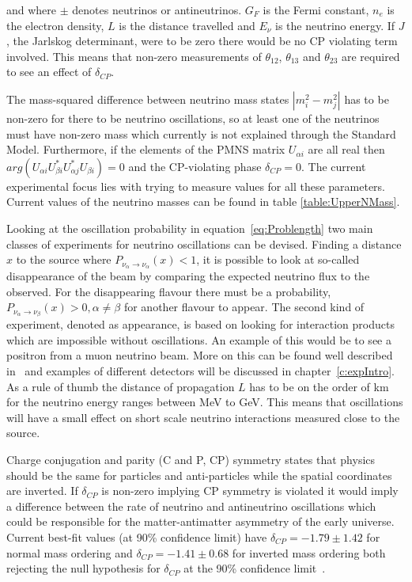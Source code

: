 and where $\pm$ denotes neutrinos or antineutrinos. $G_F$ is the Fermi constant, $n_e$ is the electron density, $L$ is the distance travelled and $E_\nu$ is the neutrino energy. If $J$, the Jarlskog determinant, were to be zero there would be no CP violating term involved. This means that non-zero measurements of $\theta_{12}$, $\theta_{13}$ and $\theta_{23}$ are required to see an effect of $\delta_{CP}$. 

The mass-squared difference between neutrino mass states $\left|m_i^2 - m_j^2\right|$ has to be non-zero for there to be neutrino oscillations, so at least one of the neutrinos must have non-zero mass which currently is not explained through the Standard Model. Furthermore, if the elements of the PMNS matrix $U_{\alpha i}$ are all real then $arg(U_{\alpha i} U^*_{\beta i} U^*_{\alpha j}  U_{\beta i} ) = 0$ and the CP-violating phase $\delta_{CP} =0$. The current experimental focus lies with trying to measure values for all these parameters. Current values of the neutrino masses can be found in table \ref{table:UpperNMass}.

Looking at the oscillation probability in equation~\eqref{eq:Problength} two main classes of experiments for neutrino oscillations can be devised. Finding a distance $x$ to the source where $P_{\nu_\alpha \rightarrow \nu_\alpha} (x) < 1$, it is possible to look at so-called disappearance of the beam by comparing the expected neutrino flux to the observed. For the disappearing flavour there must be a probability, $P_{\nu_\alpha \rightarrow \nu_\beta} (x) > 0, \alpha \neq \beta$ for another flavour to appear. The second kind of experiment, denoted as appearance, is based on looking for interaction products which are impossible without oscillations.  An example of this would be to see a positron from a muon neutrino beam. More on this can be found well described in~\cite{34doi:10.1142/9789812562203_0002} and examples of different detectors will be discussed in chapter~\ref{c:expIntro}. As a rule of thumb the distance of propagation $L$ has to be on the order of km for the neutrino energy ranges between MeV to GeV. This means that oscillations will have a small effect on short scale neutrino interactions measured close to the source.

Charge conjugation and parity (C and P, CP) symmetry states that physics should be the same for particles and anti-particles while the spatial coordinates are inverted. If $\delta_{CP}$ is non-zero implying CP symmetry is violated it would imply a difference between the rate of neutrino and antineutrino oscillations which could be responsible for the matter-antimatter asymmetry of the early universe. Current best-fit values (at 90\% confidence limit) have $\delta_{CP} = -1.79\pm 1.42$ for normal mass ordering and $\delta_{CP} = -1.41\pm 0.68$ for inverted mass ordering both rejecting the null hypothesis for $\delta_{CP}$ at the 90\% confidence limit~\cite{T2KResults}.

